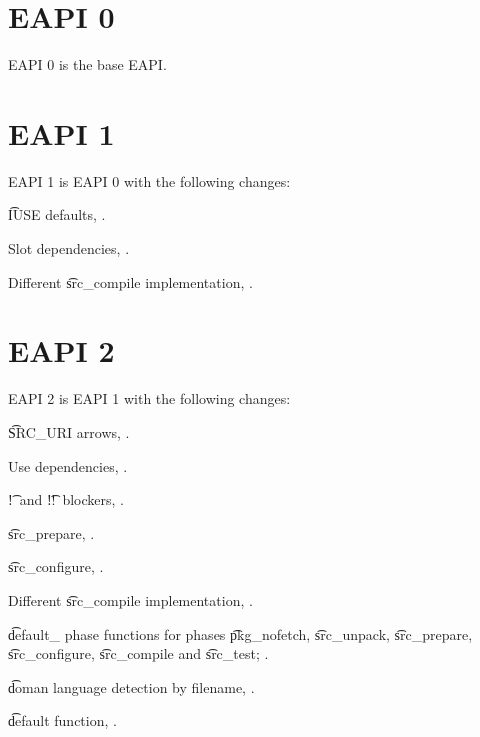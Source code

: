 
\section{EAPI 0}

EAPI 0 is the base EAPI.

\section{EAPI 1}

EAPI 1 is EAPI 0 with the following changes:

\begin{compactitem}
\item \t{IUSE} defaults, .
\item Slot dependencies, .
\item Different \t{src_compile} implementation, .
\end{compactitem}

\section{EAPI 2}

EAPI 2 is EAPI 1 with the following changes:

\begin{compactitem}
\item \t{SRC_URI} arrows, .
\item Use dependencies, .
\item \t{!}\ and \t{!!}\ blockers, .
\item \t{src_prepare}, .
\item \t{src_configure}, .
\item Different \t{src_compile} implementation, .
\item \t{default_} phase functions for phases \t{pkg_nofetch}, \t{src_unpack}, \t{src_prepare},
    \t{src_configure}, \t{src_compile} and \t{src_test}; .
\item \t{doman} language detection by filename, .
\item \t{default} function, .
\end{compactitem}

